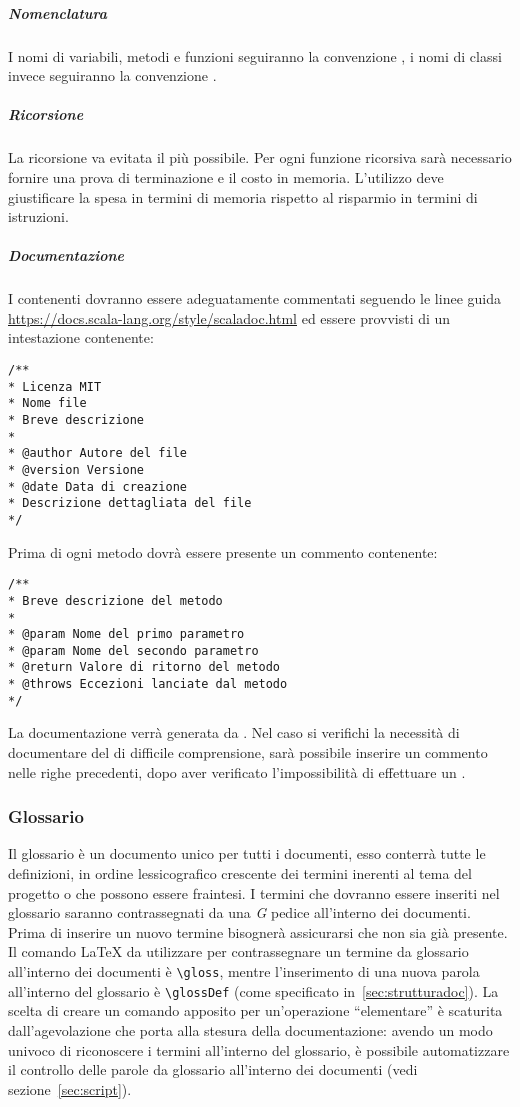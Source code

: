 \documentclass{scalatekids-article}
\begin{document}
\subparagraph{Nomenclatura}

I nomi di variabili, metodi e funzioni seguiranno la convenzione
\textit{}, i nomi di classi invece seguiranno la convenzione
\textit{}.
\subparagraph{Ricorsione}
La ricorsione va evitata il più possibile. Per ogni funzione ricorsiva sarà
necessario fornire una prova di terminazione e il costo in memoria. L'utilizzo
deve giustificare la spesa in termini di memoria rispetto al risparmio in
termini di istruzioni.

\subparagraph{Documentazione}

I  contenenti  dovranno essere adeguatamente commentati seguendo le
linee guida  \url{https://docs.scala-lang.org/style/scaladoc.html} ed essere provvisti di un
intestazione contenente:
\begin{lstlisting}
/**
* Licenza MIT
* Nome file
* Breve descrizione
*
* @author Autore del file
* @version Versione
* @date Data di creazione
* Descrizione dettagliata del file
*/
\end{lstlisting}
Prima di ogni metodo dovrà essere presente un commento  contenente:
\begin{lstlisting}
/**
* Breve descrizione del metodo
*
* @param Nome del primo parametro
* @param Nome del secondo parametro
* @return Valore di ritorno del metodo
* @throws Eccezioni lanciate dal metodo
*/
\end{lstlisting}
La documentazione verrà generata da . Nel caso si verifichi la
necessità di documentare del  di difficile comprensione, sarà possibile
inserire un commento nelle righe precedenti, dopo aver verificato
l'impossibilità di effettuare un .

\subsubsection{Glossario}

Il glossario è un documento unico per tutti i documenti, esso conterrà tutte le
definizioni, in ordine lessicografico crescente dei termini inerenti al tema
del progetto o che possono essere fraintesi. I termini che dovranno essere
inseriti nel glossario saranno contrassegnati da una \textit{G} pedice
all'interno dei documenti. Prima di inserire un nuovo termine bisognerà
assicurarsi che non sia già presente.\\ Il comando \LaTeX\xspace da utilizzare
per contrassegnare un termine da glossario all'interno dei documenti è
\verb=\gloss=, mentre l'inserimento di una nuova parola all'interno del
glossario è \verb=\glossDef= (come specificato in~\ref{sec:strutturadoc}). La
scelta di creare un comando apposito per un'operazione ``elementare'' è
scaturita dall'agevolazione che porta alla stesura della documentazione: avendo
un modo univoco di riconoscere i termini all'interno del glossario, è possibile
automatizzare il controllo delle parole da glossario all'interno dei
documenti (vedi sezione~\ref{sec:script}).
\end{document}
